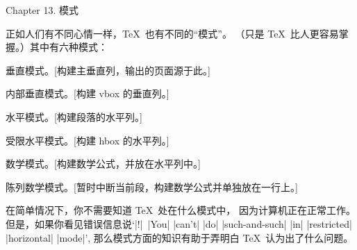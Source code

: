 


\beginchapter Chapter 13. 模式


\1正如人们有不同心情一样，\TeX\ 也有不同的``模式''。%
（只是 \TeX\ 比人更容易掌握。）其中有六种模式：

\medskip
\item\bull 垂直模式。[构建主垂直列，输出的页面源于此。]

\smallskip\item\bull 内部垂直模式。[构建 vbox 的垂直列。]

\smallskip\item\bull 水平模式。[构建段落的水平列。]

\smallskip\item\bull 受限水平模式。[构建 hbox 的水平列。]

\smallskip\item\bull 数学模式。[构建数学公式，并放在水平列中。]

\smallskip\item\bull 陈列数学模式。[暂时中断当前段，构建数学公式并单独放在一行上。]

\medskip\noindent 在简单情况下，你不需要知道 \TeX\ 处在什么模式中，
因为计算机正在正常工作。%
但是，如果你看见错误信息说`\thinspace|!|~|You| |can't| |do|
|such-and-such| |in| |restricted| |horizontal| |mode|\thinspace',
那么模式方面的知识有助于弄明白 \TeX\ 认为出了什么问题。

